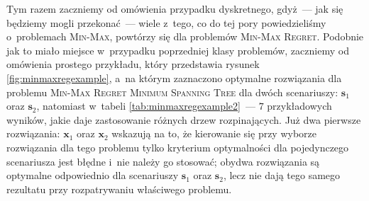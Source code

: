 Tym razem zaczniemy od omówienia przypadku dyskretnego, gdyż~--- jak się będziemy mogli przekonać~--- wiele z~tego, co do tej pory powiedzieliśmy o~problemach \textsc{Min-Max}, powtórzy się dla problemów \textsc{Min-Max Regret}.
Podobnie jak to miało miejsce w~przypadku poprzedniej klasy problemów, zaczniemy od omówienia prostego przykładu, który przedstawia rysunek \ref{fig:minmaxregexample}, a~na którym zaznaczono optymalne rozwiązania dla problemu \textsc{Min-Max Regret Minimum Spanning Tree} dla dwóch scenariuszy: $\textbf{s}_{1}$ oraz $\textbf{s}_{2}$, natomiast w~tabeli \ref{tab:minmaxregexample2}~--- $7$ przykładowych wyników, jakie daje zastosowanie różnych drzew rozpinających.
Już dwa pierwsze rozwiązania: $\textbf{x}_{1}$ oraz $\textbf{x}_{2}$ wskazują na to, że kierowanie się przy wyborze rozwiązania dla tego problemu tylko kryterium optymalności dla pojedynczego scenariusza jest błędne i~nie należy go stosować; obydwa rozwiązania są optymalne odpowiednio dla scenariuszy $\textbf{s}_{1}$ oraz $\textbf{s}_{2}$, lecz nie dają tego samego rezultatu przy rozpatrywaniu właściwego problemu.


